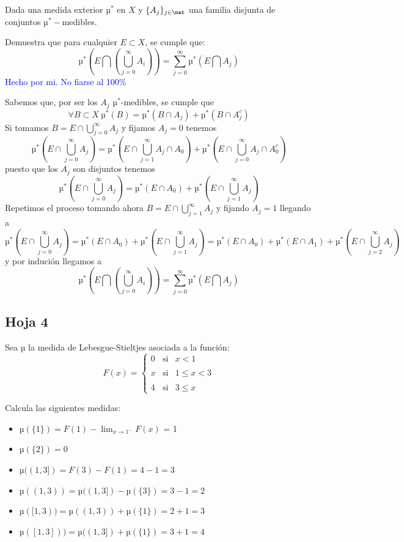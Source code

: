 \begin{problem}[17]
Dada una medida exterior $µ^*$ en $X$ y $\{A_j\}_{j \in \nat}$ una familia disjunta de conjuntos $µ^*-$medibles.

Demuestra que para cualquier $E \subset X$, se cumple que:
\[µ^*(E \bigcap (\bigcup_{j=0}^{\infty} A_i))= \sum_{j=0}^{\infty}µ^*(E \bigcap A_j)\]
\solution
\textcolor{blue}{Hecho por mi. No fiarse al 100\%}

Sabemos que, por ser los $A_j$ $µ^*$-medibles, se cumple que
\[\forall B \subset X \ µ^*(B)=µ^*(B \cap A_j) + µ^*(B \cap A_j^c)\]
Si tomamos $B=E \cap \bigcup_{j=0}^{\infty}A_j$ y fijamos $A_j=0$ tenemos
\[µ^*(E \cap \bigcup_{j=0}^{\infty}A_j)=µ^*(E \cap \bigcup_{j=1}^{\infty}A_j \cap A_0) + µ^*(E \cap \bigcup_{j=0}^{\infty}A_j \cap A_0^c)\]
puesto que los $A_j$ son disjuntos tenemos
\[µ^*(E \cap \bigcup_{j=0}^{\infty}A_j)=µ^*(E \cap A_0) + µ^*(E \cap \bigcup_{j=1}^{\infty}A_j)\]
Repetimos el proceso tomando ahora $B=E \cap \bigcup_{j=1}^{\infty}A_j$ y fijando $A_j=1$ llegando a
\[µ^*(E \cap \bigcup_{j=0}^{\infty}A_j)=µ^*(E \cap A_0) + µ^*(E \cap \bigcup_{j=1}^{\infty}A_j) = µ^*(E \cap A_0) + µ^*(E \cap A_1) + µ^*(E \cap \bigcup_{j=2}^{\infty}A_j)\]
y por indución llegamos a
\[µ^*(E \bigcap (\bigcup_{j=0}^{\infty} A_i))= \sum_{j=0}^{\infty}µ^*(E \bigcap A_j)\]
\end{problem}





\subsection{Hoja 4}

\begin{problem}
Sea µ la medida de Lebesgue-Stieltjes asociada a la función:
\[F(x)=\left\{ \begin{array}{lcc}
             0 &   \text{si}  & x < 1 \\
             \\ x & \text{si} & 1 \leq x < 3 \\
             \\ 4 &  \text{si}  & 3 \leq x
             \end{array}
   \right.\]

Calcula las siguientes medidas:
\solution
\begin{itemize}
\item $µ(\{1\}) = F(1)-\displaystyle\lim_{x \to 1^-} F(x)$ = 1
\item $µ(\{2\}) = 0$
\item $µ((1, 3]) = F(3)-F(1) = 4 - 1 = 3$
\item $µ((1, 3)) = µ((1, 3]) - µ(\{3\}) = 3 - 1 = 2$
\item $µ([1, 3)) = µ((1, 3)) + µ(\{1\}) = 2 + 1 = 3$
\item $µ([1, 3])) = µ((1, 3]) + µ (\{1\}) = 3 + 1 = 4$
\end{itemize}
\end{problem}

